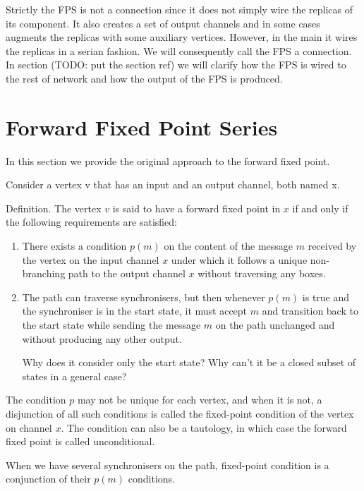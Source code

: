 Strictly the FPS is not a connection since it does not simply wire the replicas of its component. It also creates a set of output channels and in some cases augments the replicas with some auxiliary vertices. However, in the main it wires the replicas in a serian fashion. We will consequently call the FPS a connection. In section (TODO: put the section ref) we will clarify how the FPS is wired to the rest of network and how the output of the FPS is produced.


    \section{Forward Fixed Point Series}
In this section we provide the original approach to the forward fixed point.

Consider a vertex v that has an input and an output channel, both named x.

Definition. The vertex $v$ is said to have a forward fixed point in $x$ if and only if the following requirements are satisfied:

\begin{enumerate}
\item There exists a condition $p(m)$ on the content of the message $m$ received by the vertex on the input channel $x$ under which it follows a unique non-branching path to the output channel $x$ without traversing any boxes.

\item The path can traverse synchronisers, but then whenever $p(m)$ is true and the synchroniser is in the start state, it must accept $m$ and transition back to the start state while sending the message $m$ on the path unchanged and without producing any other output.

Why does it consider only the start state? Why can't it be a closed subset of states in a general case?
\end{enumerate}


The condition $p$ may not be unique for each vertex, and when it is not, a disjunction of all such conditions is called the fixed-point condition of the vertex on channel $x$. The condition can also be a tautology, in which case the forward fixed point is called unconditional.


When we have several synchronisers on the path, fixed-point condition is a conjunction of their $p(m)$ conditions.




